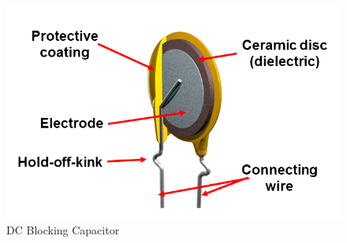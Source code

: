 \begin{figure}
\includegraphics[keepaspectratio=true,scale=.5]{./figures/parameters/dcBlocking.png}
\centering
\caption{DC Blocking Capacitor}
\label{dcBlock}
\end{figure}
